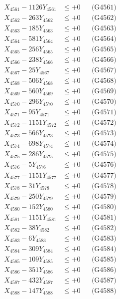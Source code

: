 \documentclass[a4paper,10pt]{article}
\begin{document}
{\begin{align}
\allowbreak
X_{4561} - 1126Y_{4561} &\leq +0 && \text{(G4561)} \\
X_{4562} - 263Y_{4562} &\leq +0 && \text{(G4562)} \\
X_{4563} - 185Y_{4563} &\leq +0 && \text{(G4563)} \\
X_{4564} - 581Y_{4564} &\leq +0 && \text{(G4564)} \\
X_{4565} - 256Y_{4565} &\leq +0 && \text{(G4565)} \\
X_{4566} - 238Y_{4566} &\leq +0 && \text{(G4566)} \\
X_{4567} - 25Y_{4567} &\leq +0 && \text{(G4567)} \\
X_{4568} - 506Y_{4568} &\leq +0 && \text{(G4568)} \\
X_{4569} - 560Y_{4569} &\leq +0 && \text{(G4569)} \\
X_{4570} - 296Y_{4570} &\leq +0 && \text{(G4570)} \\
\allowbreak
X_{4571} - 95Y_{4571} &\leq +0 && \text{(G4571)} \\
X_{4572} - 1151Y_{4572} &\leq +0 && \text{(G4572)} \\
X_{4573} - 566Y_{4573} &\leq +0 && \text{(G4573)} \\
X_{4574} - 698Y_{4574} &\leq +0 && \text{(G4574)} \\
X_{4575} - 286Y_{4575} &\leq +0 && \text{(G4575)} \\
X_{4576} - 5Y_{4576} &\leq +0 && \text{(G4576)} \\
X_{4577} - 1151Y_{4577} &\leq +0 && \text{(G4577)} \\
X_{4578} - 31Y_{4578} &\leq +0 && \text{(G4578)} \\
X_{4579} - 250Y_{4579} &\leq +0 && \text{(G4579)} \\
X_{4580} - 152Y_{4580} &\leq +0 && \text{(G4580)} \\
\allowbreak
X_{4581} - 1151Y_{4581} &\leq +0 && \text{(G4581)} \\
X_{4582} - 38Y_{4582} &\leq +0 && \text{(G4582)} \\
X_{4583} - 6Y_{4583} &\leq +0 && \text{(G4583)} \\
X_{4584} - 309Y_{4584} &\leq +0 && \text{(G4584)} \\
X_{4585} - 109Y_{4585} &\leq +0 && \text{(G4585)} \\
X_{4586} - 351Y_{4586} &\leq +0 && \text{(G4586)} \\
X_{4587} - 432Y_{4587} &\leq +0 && \text{(G4587)} \\
X_{4588} - 147Y_{4588} &\leq +0 && \text{(G4588)} \\

\end{align}}
\end{document}
